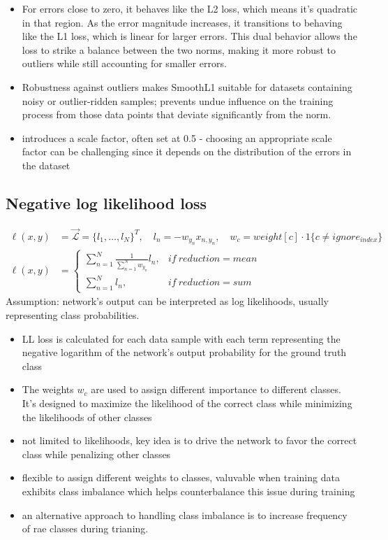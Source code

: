 \documentclass[11pt]{article}
\begin{document}
\begin{itemize}
    \item For errors close to zero, it behaves like the L2 loss, which means it's quadratic in that region. As the error magnitude increases, it transitions to behaving like the L1 loss, which is linear for larger errors. This dual behavior allows the loss to strike a balance between the two norms, making it more robust to outliers while still accounting for smaller errors.
    \item Robustness against outliers makes SmoothL1 suitable for datasets containing noisy or outlier-ridden samples; prevents undue influence on the training process from those data points that deviate significantly from the norm.
    \item introduces a scale factor, often set at 0.5 - choosing an appropriate scale factor can be challenging since it depends on the distribution of the errors in the dataset
\end{itemize}

\subsection{Negative log likelihood loss}

\begin{definition}[Smooth L1]\label{eq:negative-log-likelihood-loss}
    \begin{align*}
        \ell(x,y) & = \vec{\mathcal L} = \{l_1, \ldots, l_N \}^T, \quad l_n = -w_{y_n} x_{n,y_n}, \quad w_c = weight[c] \cdot 1\{c \neq ignore_{index}\} \\
        \ell(x,y) & = \begin{cases}
            \sum^N_{n=1}\frac{1}{\sum^N_{n=1} w_{y_n}} l_n, & if\ reduction = mean \\ 
            \sum^N_{n=1} l_n, & if\ reduction = sum
        \end{cases}
    \end{align*}
    Assumption: network's output can be interpreted as log likelihoods, usually representing class probabilities.
\end{definition}

\begin{itemize}
    \item LL loss is calculated for each data sample  with each term representing the negative logarithm of the network's output probability for the ground truth class
    \item The weights $w_c$ are used to assign different importance to different classes. It's designed to maximize the likelihood of the correct class while minimizing the likelihoods of other classes
    \item not limited to likelihoods, key idea is to drive the network to favor the correct class while penalizing other classes
    \item flexible to assign different weights to classes, valuvable when training data exhibits class imbalance which helps counterbalance this issue during training
    \item an alternative approach to handling class imbalance is to increase frequency of rae classes during trianing.
\end{itemize}
\end{document}
